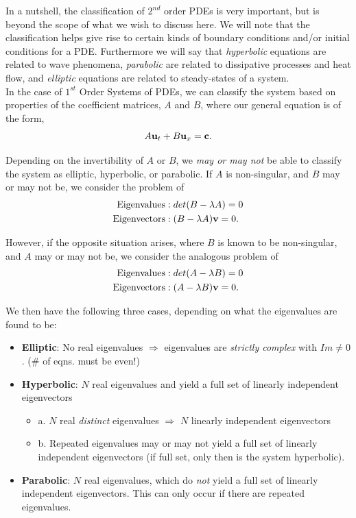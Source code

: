 In a nutshell, the classification of $2^{nd}$ order PDEs is very important, but is beyond the scope of what we wish to discuss here. We will note that the classification helps give rise to certain kinds of boundary conditions and/or initial conditions for a PDE. Furthermore we will say that \emph{hyperbolic} equations are related to wave phenomena, \emph{parabolic} are related to dissipative processes and heat flow, and \emph{elliptic} equations are related to steady-states of a system.\\

In the case of $1^{st}$ Order Systems of PDEs, we can classify the system based on properties of the coefficient matrices, $A$ and $B$, where our general equation is of the form,
$$A{\bf{u}}_t + B{\bf{u}}_x = {\bf{c}}.$$

Depending on the invertibility of $A$ or $B$, we \emph{may or may not} be able to classify the system as elliptic, hyperbolic, or parabolic. If $A$ is non-singular, and $B$ may or may not be, we consider the problem of 
\begin{align*}
\mbox{Eigenvalues}&: det(B-\lambda A) = 0 \\
\mbox{Eigenvectors}&: (B-\lambda A){\bf{v}} = 0. \\
\end{align*}

However, if the opposite situation arises, where $B$ is known to be non-singular, and $A$ may or may not be, we consider the analogous problem of
\begin{align*}
\mbox{Eigenvalues}&: det(A-\lambda B) = 0 \\
\mbox{Eigenvectors}&: (A-\lambda B){\bf{v}} = 0. \\
\end{align*}

We then have the following three cases, depending on what the eigenvalues are found to be:
\begin{itemize}
\item[] {\bf{Elliptic}}: No real eigenvalues $\Rightarrow$ eigenvalues are \emph{strictly complex} with $Im\neq 0$. ($\#$ of eqns. must be even!)
\item[] {\bf{Hyperbolic}}: $N$ real eigenvalues and yield a full set of linearly independent eigenvectors
\begin{itemize}
\item a. $N$ real \emph{distinct} eigenvalues $\Rightarrow$ $N$ linearly independent eigenvectors
\item b. Repeated eigenvalues may or may not yield a full set of linearly independent eigenvectors (if full set, only then is the system hyperbolic).
\end{itemize}
\item[] {\bf{Parabolic}}:  $N$ real eigenvalues, which do \emph{not} yield a full set of linearly independent eigenvectors. This can only occur if there are repeated eigenvalues.
\end{itemize}

